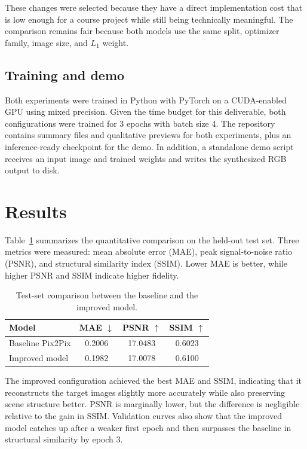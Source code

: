 \documentclass[conference]{IEEEtran}
\begin{document}
These changes were selected because they have a direct implementation cost that is low enough for a course project while still being technically meaningful. The comparison remains fair because both models use the same split, optimizer family, image size, and $L_1$ weight.

\subsection{Training and demo}
Both experiments were trained in Python with PyTorch on a CUDA-enabled GPU using mixed precision. Given the time budget for this deliverable, both configurations were trained for 3 epochs with batch size 4. The repository contains summary files and qualitative previews for both experiments, plus an inference-ready checkpoint for the demo. In addition, a standalone demo script receives an input image and trained weights and writes the synthesized RGB output to disk.

\section{Results}
Table~\ref{tab:results} summarizes the quantitative comparison on the held-out test set. Three metrics were measured: mean absolute error (MAE), peak signal-to-noise ratio (PSNR), and structural similarity index (SSIM). Lower MAE is better, while higher PSNR and SSIM indicate higher fidelity.

\begin{table}[t]
\caption{Test-set comparison between the baseline and the improved model.}
\label{tab:results}
\centering
\begin{tabular}{lccc}
\toprule
Model & MAE $\downarrow$ & PSNR $\uparrow$ & SSIM $\uparrow$ \\
\midrule
Baseline Pix2Pix & 0.2006 & 17.0483 & 0.6023 \\
Improved model & 0.1982 & 17.0078 & 0.6100 \\
\bottomrule
\end{tabular}
\end{table}

The improved configuration achieved the best MAE and SSIM, indicating that it reconstructs the target images slightly more accurately while also preserving scene structure better. PSNR is marginally lower, but the difference is negligible relative to the gain in SSIM. Validation curves also show that the improved model catches up after a weaker first epoch and then surpasses the baseline in structural similarity by epoch 3.
\end{document}

